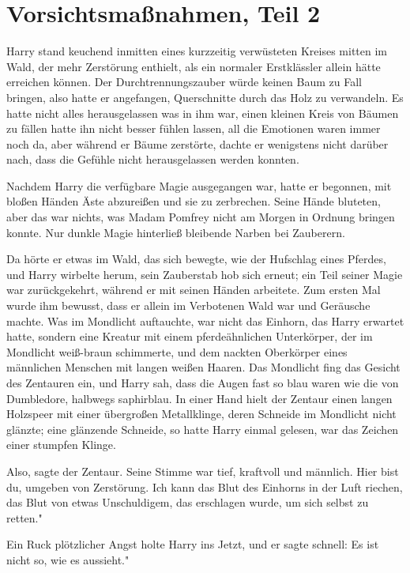 \chapter{Vorsichtsmaßnahmen, Teil 2}

Harry stand keuchend inmitten eines kurzzeitig verwüsteten Kreises mitten im
Wald, der mehr Zerstörung enthielt, als ein normaler Erstklässler allein hätte
erreichen können. Der Durchtrennungszauber würde keinen Baum zu Fall bringen,
also hatte er angefangen, Querschnitte durch das Holz zu verwandeln. Es hatte
nicht alles herausgelassen was in ihm war, einen kleinen Kreis von Bäumen zu
fällen hatte ihn nicht besser fühlen lassen, all die Emotionen waren immer noch
da, aber während er Bäume zerstörte, dachte er wenigstens nicht darüber nach,
dass die Gefühle nicht herausgelassen werden konnten.

Nachdem Harry die verfügbare Magie ausgegangen war, hatte er begonnen, mit
bloßen Händen Äste abzureißen und sie zu zerbrechen. Seine Hände bluteten, aber
das war nichts, was Madam Pomfrey nicht am Morgen in Ordnung bringen konnte. Nur
dunkle Magie hinterließ bleibende Narben bei Zauberern.

Da hörte er etwas im Wald, das sich bewegte, wie der Hufschlag eines Pferdes,
und Harry wirbelte herum, sein Zauberstab hob sich erneut; ein Teil seiner Magie
war zurückgekehrt, während er mit seinen Händen arbeitete. Zum ersten Mal wurde
ihm bewusst, dass er allein im Verbotenen Wald war und Geräusche machte. Was im
Mondlicht auftauchte, war nicht das Einhorn, das Harry erwartet hatte, sondern
eine Kreatur mit einem pferdeähnlichen Unterkörper, der im Mondlicht weiß-braun
schimmerte, und dem nackten Oberkörper eines männlichen Menschen mit langen
weißen Haaren. Das Mondlicht fing das Gesicht des Zentauren ein, und Harry sah,
dass die Augen fast so blau waren wie die von Dumbledore, halbwegs saphirblau.
In einer Hand hielt der Zentaur einen langen Holzspeer mit einer übergroßen
Metallklinge, deren Schneide im Mondlicht nicht glänzte; eine glänzende
Schneide, so hatte Harry einmal gelesen, war das Zeichen einer stumpfen Klinge.

\glqq{}Also\grqq{}, sagte der Zentaur. Seine Stimme war tief, kraftvoll und
männlich. \glqq{}Hier bist du, umgeben von Zerstörung. Ich kann das Blut des
Einhorns in der Luft riechen, das Blut von etwas Unschuldigem, das erschlagen
wurde, um sich selbst zu retten."

Ein Ruck plötzlicher Angst holte Harry ins Jetzt, und er sagte schnell: \glqq{}Es
ist nicht so, wie es aussieht."

